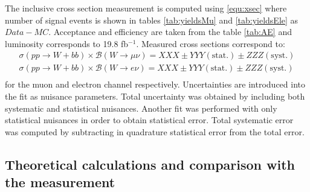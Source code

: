 The inclusive cross section measurement is computed using \ref{equ:xsec} where number of signal events is shown in tables \ref{tab:yieldsMu} and \ref{tab:yieldsEle} as $Data-MC$. Acceptance and efficiency are taken from the table \ref{tab:AE} and luminosity corresponds to 19.8 fb$^{-1}$. Measured cross sections correspond to:
\begin{align*}
\sigma(pp\rightarrow W+bb)\times \mathcal{B}(W\rightarrow \mu\nu) = XXX \pm YYY(\mathrm{stat.}) \pm ZZZ(\mathrm{syst.})\\
\sigma(pp\rightarrow W+bb)\times \mathcal{B}(W\rightarrow e\nu) = XXX \pm YYY(\mathrm{stat.}) \pm ZZZ(\mathrm{syst.})\\
\end{align*}
for the muon and electron channel respectively. Uncertainties are introduced into the fit as nuisance parameters. Total uncertainty was obtained by including both systematic and statistical nuisances. Another fit was performed with only statistical nuisances in order to obtain statistical error. Total systematic error was computed by subtracting in quadrature statistical error from the total error.  

\subsection{Theoretical calculations and comparison with the measurement}





%
%
%
%
%

